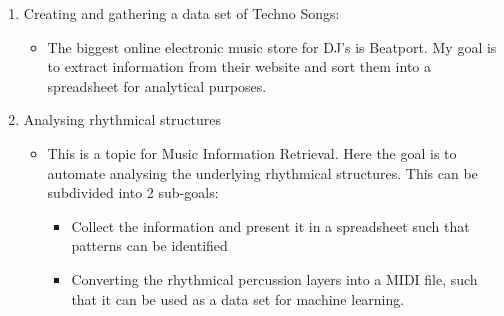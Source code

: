 \documentclass{article}
\begin{document}
\begin{enumerate}
    \item Creating and gathering a data set of Techno Songs:
    \begin{itemize}
        \item The biggest online electronic music store for DJ's is Beatport. My goal is to extract information from their website and sort them into a spreadsheet for analytical purposes.
    \end{itemize}
    \item Analysing rhythmical structures
    \begin{itemize}
        \item This is a topic for Music Information Retrieval. Here the goal is to automate analysing the underlying rhythmical structures. This can be subdivided into 2 sub-goals:
        \begin{itemize}
            \item Collect the information and present it in a spreadsheet such that patterns can be identified
            \item Converting the rhythmical percussion layers into a MIDI file, such that it can be used as a data set for machine learning.
        \end{itemize}
    \end{itemize}
\end{enumerate}
\end{document}

